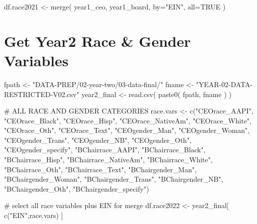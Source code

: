 \documentclass[
  letterpaper,
]{scrbook}
\newenvironment{Shaded}{\begin{snugshade}}{\end{snugshade}}
\newcommand{\AttributeTok}[1]{\textcolor[rgb]{0.40,0.45,0.13}{#1}}
\newcommand{\CommentTok}[1]{\textcolor[rgb]{0.37,0.37,0.37}{#1}}
\newcommand{\ConstantTok}[1]{\textcolor[rgb]{0.56,0.35,0.01}{#1}}
\newcommand{\FunctionTok}[1]{\textcolor[rgb]{0.28,0.35,0.67}{#1}}
\newcommand{\NormalTok}[1]{\textcolor[rgb]{0.00,0.23,0.31}{#1}}
\newcommand{\OtherTok}[1]{\textcolor[rgb]{0.00,0.23,0.31}{#1}}
\newcommand{\StringTok}[1]{\textcolor[rgb]{0.13,0.47,0.30}{#1}}
\begin{document}
\begin{Shaded}
\begin{Highlighting}[]
\NormalTok{df.race2021 }\OtherTok{\textless{}{-}} \FunctionTok{merge}\NormalTok{( year1\_ceo, year1\_board, }\AttributeTok{by=}\StringTok{"EIN"}\NormalTok{, }\AttributeTok{all=}\ConstantTok{TRUE}\NormalTok{ )}
\end{Highlighting}
\end{Shaded}

\chapter{Get Year2 Race \& Gender
Variables}\label{get-year2-race-gender-variables}

\begin{Shaded}
\begin{Highlighting}[]
\NormalTok{fpath }\OtherTok{\textless{}{-}} \StringTok{"DATA{-}PREP/02{-}year{-}two/03{-}data{-}final/"}
\NormalTok{fname }\OtherTok{\textless{}{-}} \StringTok{"YEAR{-}02{-}DATA{-}RESTRICTED{-}V02.csv"}
\NormalTok{year2\_final }\OtherTok{\textless{}{-}} \FunctionTok{read.csv}\NormalTok{( }\FunctionTok{paste0}\NormalTok{( fpath, fname ) )}

\CommentTok{\# ALL RACE AND GENDER CATEGORIES }
\NormalTok{race.vars }\OtherTok{\textless{}{-}} 
\FunctionTok{c}\NormalTok{(}\StringTok{"CEOrace\_AAPI"}\NormalTok{, }\StringTok{"CEOrace\_Black"}\NormalTok{, }\StringTok{"CEOrace\_Hisp"}\NormalTok{, }\StringTok{"CEOrace\_NativeAm"}\NormalTok{, }
\StringTok{"CEOrace\_White"}\NormalTok{, }\StringTok{"CEOrace\_Oth"}\NormalTok{, }\StringTok{"CEOrace\_Text"}\NormalTok{, }\StringTok{"CEOgender\_Man"}\NormalTok{, }
\StringTok{"CEOgender\_Woman"}\NormalTok{, }\StringTok{"CEOgender\_Trans"}\NormalTok{, }\StringTok{"CEOgender\_NB"}\NormalTok{, }\StringTok{"CEOgender\_Oth"}\NormalTok{, }
\StringTok{"CEOgender\_specify"}\NormalTok{, }\StringTok{"BChairrace\_AAPI"}\NormalTok{, }\StringTok{"BChairrace\_Black"}\NormalTok{, }\StringTok{"BChairrace\_Hisp"}\NormalTok{, }
\StringTok{"BChairrace\_NativeAm"}\NormalTok{, }\StringTok{"BChairrace\_White"}\NormalTok{, }\StringTok{"BChairrace\_Oth"}\NormalTok{, }
\StringTok{"BChairrace\_Text"}\NormalTok{, }\StringTok{"BChairgender\_Man"}\NormalTok{, }\StringTok{"BChairgender\_Woman"}\NormalTok{, }
\StringTok{"BChairgender\_Trans"}\NormalTok{, }\StringTok{"BChairgender\_NB"}\NormalTok{, }\StringTok{"BChairgender\_Oth"}\NormalTok{, }
\StringTok{"BChairgender\_specify"}\NormalTok{)}


\CommentTok{\# select all race variables plus EIN for merge }
\NormalTok{df.race2022 }\OtherTok{\textless{}{-}}\NormalTok{ year2\_final[ }\FunctionTok{c}\NormalTok{(}\StringTok{"EIN"}\NormalTok{,race.vars) ]}
\end{Highlighting}
\end{Shaded}
\end{document}
